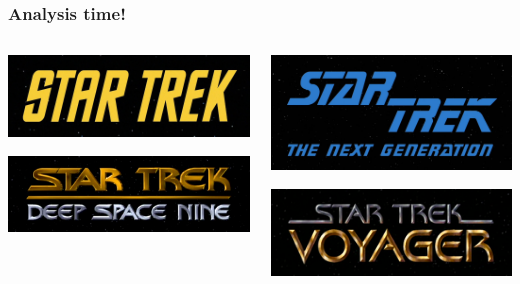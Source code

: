 \documentclass{beamer}
\begin{document}
\begin{frame}
  \frametitle{Analysis time!}
  \begin{columns}
    \begin{column}{0.5\textwidth}
      \includegraphics[width = \textwidth, keepaspectratio = true]{figure/tos}

      \includegraphics[width = \textwidth, keepaspectratio = true]{figure/ds9}
    \end{column}
    \begin{column}{0.5\textwidth}
      \includegraphics[width = \textwidth, keepaspectratio = true]{figure/tng}

      \includegraphics[width = \textwidth, keepaspectratio = true]{figure/voy}
    \end{column}
  \end{columns}
\end{frame}
\end{document}
